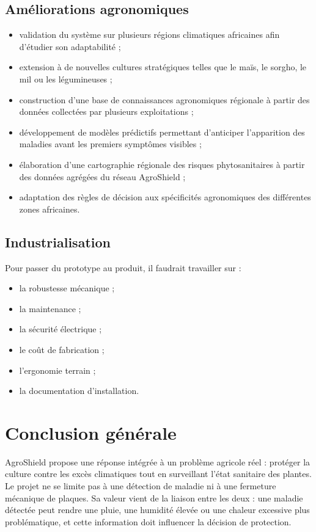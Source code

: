 ﻿\documentclass[11pt,a4paper,openany]{report}
\begin{document}
\section{Améliorations agronomiques}
\begin{itemize}

\item validation du système sur plusieurs régions climatiques africaines afin d'étudier son adaptabilité ;

\item extension à de nouvelles cultures stratégiques telles que le maïs, le sorgho, le mil ou les légumineuses ;

\item construction d'une base de connaissances agronomiques régionale à partir des données collectées par plusieurs exploitations ;

\item développement de modèles prédictifs permettant d'anticiper l'apparition des maladies avant les premiers symptômes visibles ;

\item élaboration d'une cartographie régionale des risques phytosanitaires à partir des données agrégées du réseau AgroShield ;

\item adaptation des règles de décision aux spécificités agronomiques des différentes zones africaines.

\end{itemize}

\section{Industrialisation}
Pour passer du prototype au produit, il faudrait travailler sur :
\begin{itemize}
  \item la robustesse mécanique ;
  \item la maintenance ;
  \item la sécurité électrique ;
  \item le coût de fabrication ;
  \item l'ergonomie terrain ;
  \item la documentation d'installation.
\end{itemize}

\chapter*{Conclusion générale}
AgroShield propose une réponse intégrée à un problème agricole réel : protéger la culture contre les excès climatiques tout en surveillant l'état sanitaire des plantes. Le projet ne se limite pas à une détection de maladie ni à une fermeture mécanique de plaques. Sa valeur vient de la liaison entre les deux : une maladie détectée peut rendre une pluie, une humidité élevée ou une chaleur excessive plus problématique, et cette information doit influencer la décision de protection.
\end{document}
